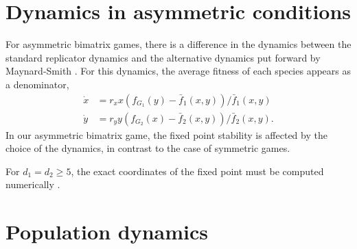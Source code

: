\documentclass{pnastwo}
\begin{document}
\begin{article}
\section{Dynamics in asymmetric conditions}


For asymmetric bimatrix games, there is a difference in the dynamics between the standard replicator dynamics and the 
alternative dynamics put forward by Maynard-Smith \cite{maynard-smith:1982to}.
For this dynamics, the average fitness of each species appears as a denominator,
\begin{align}
\dot{x} &= r_x x \left(f_{G_1}(y) -  \bar{f}_1(x,y) \right)/\bar{f}_1(x,y) \nonumber \\
\dot{y} &= r_y y \left(f_{G_2}(x) -  \bar{f}_2(x,y) \right)/\bar{f}_2(x,y).
\label{eq:repeqs}
\end{align}
In our asymmetric bimatrix game, the fixed point stability is affected by the choice of the dynamics, in contrast to the case of symmetric games. 

For $d_1=d_2 \geq 5$, the exact coordinates of the fixed point must be computed numerically \cite{abel:AO:1824,stewart:book:2004}.


\section{Population dynamics}


\end{article}
\end{document}
